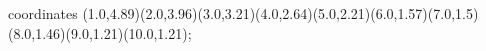 					coordinates { (1.0,4.89)(2.0,3.96)(3.0,3.21)(4.0,2.64)(5.0,2.21)(6.0,1.57)(7.0,1.5)(8.0,1.46)(9.0,1.21)(10.0,1.21)};
